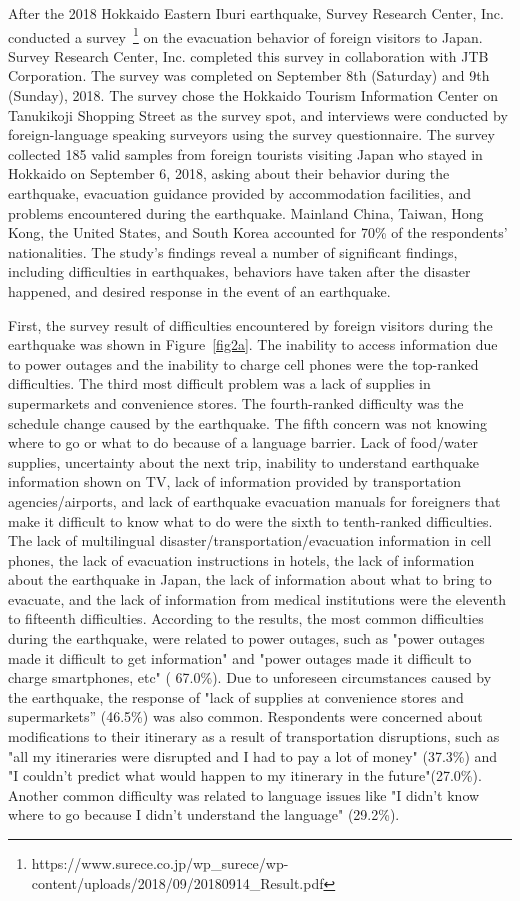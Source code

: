After the 2018 Hokkaido Eastern Iburi earthquake, Survey Research Center, Inc. conducted a survey~\footnote{https://www.surece.co.jp/wp\_surece/wp-content/uploads/2018/09/20180914\_Result.pdf} on the evacuation behavior of foreign visitors to Japan. Survey Research Center, Inc. completed this survey in collaboration with JTB Corporation. The survey was completed on September 8th (Saturday) and 9th (Sunday), 2018. The survey chose the Hokkaido Tourism Information Center on Tanukikoji Shopping Street as the survey spot, and interviews were conducted by foreign-language speaking surveyors using the survey questionnaire. The survey collected 185 valid samples from foreign tourists visiting Japan who stayed in Hokkaido on September 6, 2018, asking about their behavior during the earthquake, evacuation guidance provided by accommodation facilities, and problems encountered during the earthquake. Mainland China, Taiwan, Hong Kong, the United States, and South Korea accounted for 70\% of the respondents' nationalities. The study's findings reveal a number of significant findings, including difficulties in earthquakes, behaviors have taken after the disaster happened, and desired response in the event of an earthquake.

First, the survey result of difficulties encountered by foreign visitors during the earthquake was shown in Figure~\ref{fig2a}. The inability to access information due to power outages and the inability to charge cell phones were the top-ranked difficulties. The third most difficult problem was a lack of supplies in supermarkets and convenience stores. The fourth-ranked difficulty was the schedule change caused by the earthquake. The fifth concern was not knowing where to go or what to do because of a language barrier. Lack of food/water supplies, uncertainty about the next trip, inability to understand earthquake information shown on TV, lack of information provided by transportation agencies/airports, and lack of earthquake evacuation manuals for foreigners that make it difficult to know what to do were the sixth to tenth-ranked difficulties. The lack of multilingual disaster/transportation/evacuation information in cell phones, the lack of evacuation instructions in hotels, the lack of information about the earthquake in Japan, the lack of information about what to bring to evacuate, and the lack of information from medical institutions were the eleventh to fifteenth difficulties. According to the results, the most common difficulties during the earthquake, were related to power outages, such as "power outages made it difficult to get information" and "power outages made it difficult to charge smartphones, etc" ( 67.0\%). Due to unforeseen circumstances caused by the earthquake, the response of "lack of supplies at convenience stores and supermarkets”  (46.5\%) was also common. Respondents were concerned about modifications to their itinerary as a result of transportation disruptions, such as "all my itineraries were disrupted and I had to pay a lot of money" (37.3\%) and "I couldn't predict what would happen to my itinerary in the future"(27.0\%). Another common difficulty was related to language issues like "I didn't know where to go because I didn't understand the language" (29.2\%).

